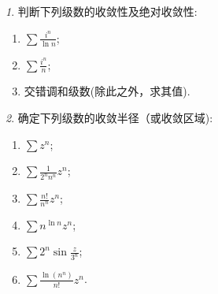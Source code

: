 \documentclass[11pt]{article}
\theoremstyle{remark}
\newtheorem{problem}{}
\begin{document}
\begin{problem}
  判断下列级数的收敛性及绝对收敛性:
  \begin{enumerate}
    \item $\sum \frac{i^n}{\ln n}$;
    \item $\sum \frac{i^n}{n}$;
    \item  交错调和级数(除此之外，求其值).
  \end{enumerate}
\end{problem}


\begin{problem}
  确定下列级数的收敛半径（或收敛区域):
  \begin{enumerate}
    \item $\sum z^n$;
    \item $\sum \frac{1}{2^n n^n} z^n$;
    \item $\sum \frac{n !}{n^n} z^n$;
    \item $\sum n^{\ln{n}} z^n$;
    \item $\sum 2^n \sin \frac{z}{3^n}$;
    \item $\sum \frac{\ln \left(n^n\right)}{n !} z^n$.
  \end{enumerate}
\end{problem}






\end{document}
